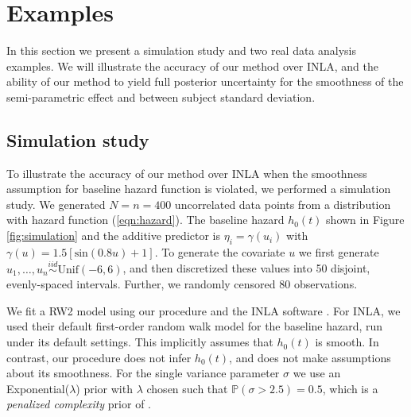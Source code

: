 \documentclass[]{article}
\begin{document}
\section{Examples}\label{sec:example}

In this section we present a simulation study and two real data analysis examples. We will illustrate the accuracy of our method over INLA, and the ability of our method to yield full posterior uncertainty for the smoothness of the semi-parametric effect and between subject standard deviation.

\subsection{Simulation study}

To illustrate the accuracy of our method over INLA when the smoothness assumption for baseline hazard function is violated, we performed a simulation study. We generated $N = n = 400$ uncorrelated data points from a distribution with hazard function (\ref{eqn:hazard}). The baseline hazard $h_{0}(t)$ shown in Figure \ref{fig:simulation} and the additive predictor is $\eta_{i} = \gamma\left(u_{i}\right)$ with $\gamma(u) = 1.5 [ \text{sin}(0.8u) + 1 ]$. To generate the covariate $u$ we first generate $u_{1},\ldots,u_{n}\overset{iid}{\sim}\text{Unif}(-6,6)$, and then discretized these values into 50 disjoint, evenly-spaced intervals. Further, we randomly censored $80$ observations. 

We fit a RW2 model using our procedure and the INLA software \citep{inla}. For INLA, we used their default first-order random walk model for the baseline hazard, run under its default settings. This implicitly assumes that $h_{0}(t)$ is smooth. In contrast, our procedure does not infer $h_{0}(t)$, and does not make assumptions about its smoothness. For the single variance parameter $\sigma$ we use an Exponential($\lambda$) prior with $\lambda$ chosen such that $\mathbb{P}\left( \sigma > 2.5\right) = 0.5$, which is a \emph{penalized complexity} prior of \citep{pcprior}.
\end{document}
